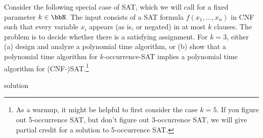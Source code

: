 \documentclass{article}
\begin{document}
\setcounter{section}{9}
\setcounter{exercise}{8}
\begin{exercise}
  Consider the following special case of SAT, which we will call  for a fixed parameter $k \in \bbN$.
  The input consists of a SAT formula $f (x_1, \ldots, x_n)$ in CNF such that every variable $x_i$ appears (as is, or negated) in at most $k$ clauses.
  The problem is to decide whether there is a satisfying assignment.
  For $k = 3$, either (a) design and analyze a polynomial time algorithm, or (b) show that a polynomial time algorithm for $k$-occurrence-SAT implies a polynomial time algorithm for (CNF-)SAT.\footnote{As a warmup, it might be helpful to first consider the case $k = 5$.
  If you figure out 5-occurrence SAT, but don't figure out 3-occurrence SAT, we will give partial credit for a solution to 5-occurrence SAT.}
\end{exercise}

\begin{solution}
solution
\end{solution}
\pagebreak
\end{document}
